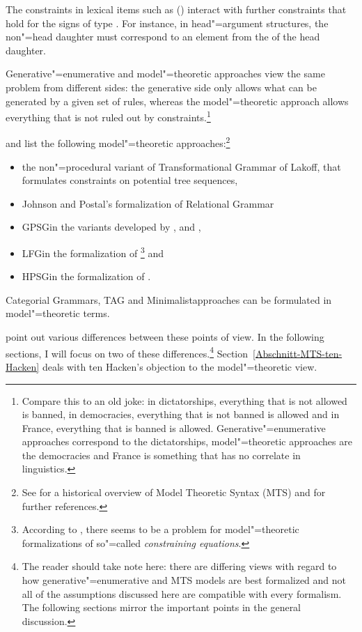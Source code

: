 The constraints in lexical items such as () interact with further constraints that hold for the signs of type
. For instance, in head"=argument structures, the non"=head daughter must correspond to an element from the \subcatl of
the head daughter.
 
Generative"=enumerative and model"=theoretic approaches view the same problem from different sides: the generative side only
allows what can be generated by a given set of rules, whereas the model"=theoretic approach allows everything that is not ruled out
by constraints.\footnote{
Compare this to an old joke: in dictatorships, everything that is not allowed is banned, in democracies, everything
that is not banned is allowed and in France, everything that is banned is allowed. Generative"=enumerative approaches correspond
to the dictatorships, model"=theoretic approaches are the democracies and France is something that has no correlate in linguistics.
}

\citet[--20]{PS2001a} and \citet{Pullum2007a} list the following model"=theoretic approaches:\footnote{
  See  for a historical overview of Model Theoretic Syntax (MTS) and for further references.
}
\begin{itemize}
\item the non"=procedural variant of Transformational Grammar of Lakoff, that formulates
constraints on potential tree sequences,
\item Johnson and Postal's formalization of Relational Grammar \citeyearpar{JP80a-u} 
\item GPSG\indexgpsg in the variants developed by \citet{GPCKHL88a}, \citet{BGM93a-u} and \citet{Rogers97a},
\item LFG\indexlfg in the formalization of \citet{Kaplan95a}\footnote{
  According to \citet[Section~3.2]{Pullum2013a}, there seems to be a problem for model"=theoretic formalizations of so"=called
  \emph{constraining equations}.
} and   
\item HPSG\indexhpsg in the formalization of \citet{King99a-u}.
\end{itemize}
Categorial Grammars\indexcg \citep{BvN94a-u}, TAG\indextag \citep{RVS94a-u} and
Minimalist\indexmp approaches \citep{Veenstra98a} can be formulated in model"=theoretic terms.

\citet{PS2001a} point out various differences between these points of view. In the following sections, I will focus on two of these differences.\footnote{
	The reader should take note here: there are differing views with regard to how generative"=enumerative and MTS models are best formalized and not
	all of the assumptions discussed here are compatible with every formalism. The following sections mirror the important points in the general discussion.%
} Section~\ref{Abschnitt-MTS-ten-Hacken} deals with ten Hacken's objection to the model"=theoretic view.

